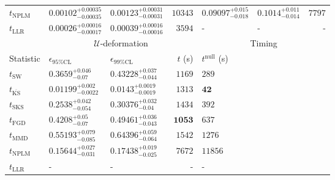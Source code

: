\begin{tabular}{l|llr|llr}
\rowcolor{red!35}	$t_{\mathrm{NPLM}}$ & $0.00102_{-0.00035}^{+0.00035}$ & $0.00123_{-0.00031}^{+0.00031}$ & $10343$ & $0.09097_{-0.018}^{+0.015}$ & $0.1014_{-0.014}^{+0.011}$ & $7797$ \\
	$t_{\mathrm{LLR}}$ & $0.00026_{-0.00017}^{+0.00016}$ & $0.00039_{-0.00016}^{+0.00016}$ & $3594$ & - & - & - \\
	\toprule
	\multicolumn{1}{c}{} & \multicolumn{3}{c}{$\mathcal{U}$-deformation} & \multicolumn{3}{c}{Timing} \\
	Statistic & $\epsilon_{95\%\mathrm{CL}}$ & $\epsilon_{99\%\mathrm{CL}}$ & $t$ (s) & $t^{\mathrm{null}}$ (s) \\
	\midrule
	$t_{\mathrm{SW}}$ & $0.3659_{-0.07}^{+0.046}$ & $0.43228_{-0.044}^{+0.037}$ & $1169$ & $289$ \\
	$t_{\overline{\mathrm{KS}}}$ & ${\mathbf{0.01199_{-0.0022}^{+0.002}}}$ & ${\mathbf{0.0143_{-0.0019}^{+0.0019}}}$ & $1313$ & ${\mathbf{42}}$ \\
	$t_{\mathrm{SKS}}$ & $0.2538_{-0.054}^{+0.042}$ & $0.30376_{-0.04}^{+0.032}$ & $1434$ & $392$ \\
	$t_{\mathrm{FGD}}$ & $0.4208_{-0.07}^{+0.05}$ & $0.49461_{-0.043}^{+0.036}$ & ${\mathbf{1053}}$ & $637$ \\
	$t_{\mathrm{MMD}}$ & $0.55193_{-0.085}^{+0.079}$ & $0.64396_{-0.064}^{+0.059}$ & $1542$ & $1276$ \\
\rowcolor{red!35}	$t_{\mathrm{NPLM}}$ & $0.15644_{-0.031}^{+0.027}$ & $0.17438_{-0.025}^{+0.019}$ & $7672$ & $11856$ \\
	$t_{\mathrm{LLR}}$ & - & - & - & - \\
	\bottomrule
\end{tabular}